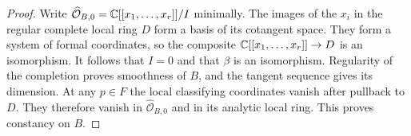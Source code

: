 \begin{proof}
Write $\widehat{\mathcal O}_{B,0}=\mathbb C[[x_1,\ldots,x_r]]/I$
minimally. The images of the $x_i$ in the regular complete local ring
$D$ form a basis of its cotangent space. They form a system of formal
coordinates, so the composite $\mathbb C[[x_1,\ldots,x_r]]\to D$ is an
isomorphism. It follows that $I=0$ and that $\beta$ is an isomorphism.
Regularity of the completion proves smoothness of $B$, and the
tangent sequence gives its dimension. At any $p\in F$ the local
classifying coordinates vanish after pullback to $D$. They therefore
vanish in $\widehat{\mathcal O}_{B,0}$ and in its analytic local
ring. This proves constancy on $B$.
\end{proof}
